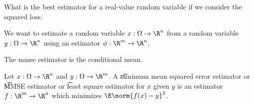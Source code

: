 

What is the best estimator for a real-value random variable if we consider the squared loss.


We want to estimate a random variable $x: \Omega \to \R^n$ from a random variable $y: \Omega \to \R^n$ using an estimator $\phi: \R^m \to \R^n$.

\begin{proposition}
  The mmse estimator is the conditional mean.
\end{proposition}

Let $x:\Omega\to\R^n$ and $y: \Omega \to \R^m$.
A \t{minimum mean squared error estimator} or \t{MMSE estimator} or \t{least square estimator} for $x$ given $y$ is an estimator $f: \R^m \to \R^n$ which minimizes $\E \norm{f(x) - y}^2$.

\blankpage
